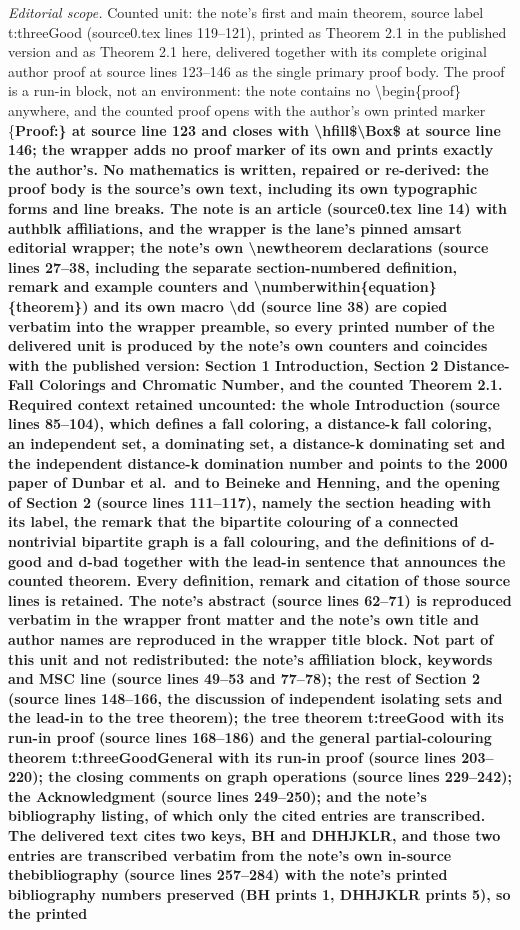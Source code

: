 \documentclass[10pt,a4paper]{amsart}
\numberwithin{equation}{theorem}
\begin{document}
\noindent\textit{Editorial scope.} Counted unit: the note's first and main theorem, source label t:threeGood (source0.tex lines 119--121), printed as Theorem 2.1 in the published version and as Theorem 2.1 here, delivered together with its complete original author proof at source lines 123--146 as the single primary proof body. The proof is a run-in block, not an environment: the note contains no \textbackslash{}begin\{proof\} anywhere, and the counted proof opens with the author's own printed marker \{\bf Proof:\} at source line 123 and closes with \textbackslash{}hfill\$\textbackslash{}Box\$ at source line 146; the wrapper adds no proof marker of its own and prints exactly the author's. No mathematics is written, repaired or re-derived: the proof body is the source's own text, including its own typographic forms and line breaks. The note is an article (source0.tex line 14) with authblk affiliations, and the wrapper is the lane's pinned amsart editorial wrapper; the note's own \textbackslash{}newtheorem declarations (source lines 27--38, including the separate section-numbered definition, remark and example counters and \textbackslash{}numberwithin\{equation\}\{theorem\}) and its own macro \textbackslash{}dd (source line 38) are copied verbatim into the wrapper preamble, so every printed number of the delivered unit is produced by the note's own counters and coincides with the published version: Section 1 Introduction, Section 2 Distance-Fall Colorings and Chromatic Number, and the counted Theorem 2.1. Required context retained uncounted: the whole Introduction (source lines 85--104), which defines a fall coloring, a distance-k fall coloring, an independent set, a dominating set, a distance-k dominating set and the independent distance-k domination number and points to the 2000 paper of Dunbar et al.\ and to Beineke and Henning, and the opening of Section 2 (source lines 111--117), namely the section heading with its label, the remark that the bipartite colouring of a connected nontrivial bipartite graph is a fall colouring, and the definitions of d-good and d-bad together with the lead-in sentence that announces the counted theorem. Every definition, remark and citation of those source lines is retained. The note's abstract (source lines 62--71) is reproduced verbatim in the wrapper front matter and the note's own title and author names are reproduced in the wrapper title block. Not part of this unit and not redistributed: the note's affiliation block, keywords and MSC line (source lines 49--53 and 77--78); the rest of Section 2 (source lines 148--166, the discussion of independent isolating sets and the lead-in to the tree theorem); the tree theorem t:treeGood with its run-in proof (source lines 168--186) and the general partial-colouring theorem t:threeGoodGeneral with its run-in proof (source lines 203--220); the closing comments on graph operations (source lines 229--242); the Acknowledgment (source lines 249--250); and the note's bibliography listing, of which only the cited entries are transcribed. The delivered text cites two keys, BH and DHHJKLR, and those two entries are transcribed verbatim from the note's own in-source thebibliography (source lines 257--284) with the note's printed bibliography numbers preserved (BH prints 1, DHHJKLR prints 5), so the printed 
\end{document}
